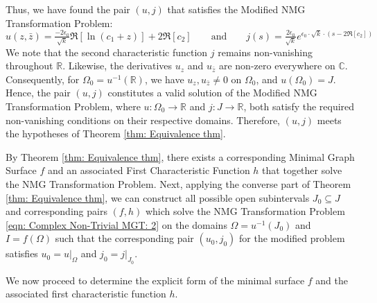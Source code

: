 \documentclass[12pt]{article}
\theoremstyle{plain}
\theoremstyle{definition}
\theoremstyle{remark}
\begin{document}
Thus, we have found the pair \((u,j)\) that satisfies the Modified NMG Transformation Problem:
\[
\boxed{u(z,\bar z)=\tfrac{-2\epsilon_0}{\sqrt{k}}\Re[\ln(c_1 +  z)]+2\Re[c_2]}\qquad\text{and}\qquad\boxed{j(s)=\tfrac{2\epsilon_0}{\sqrt{k}}e^{\epsilon_0\cdot\sqrt{k}\cdot(s-2\Re[c_2])}}
\]
We note that the second characteristic function \(j\) remains non-vanishing throughout \(\mathbb{R}\). Likewise, the derivatives \(u_z\) and \(u_{\bar{z}}\) are non-zero everywhere on \(\mathbb{C}\). Consequently, for \(\Omega_0 = u^{-1}(\mathbb{R})\), we have \(u_z, u_{\bar{z}} \neq 0\) on \(\Omega_0\), and \(u(\Omega_0) = J\). Hence, the pair \((u, j)\) constitutes a valid solution of the Modified NMG Transformation Problem, where \(u : \Omega_0 \to \mathbb{R}\) and \(j : J \to \mathbb{R}\), both satisfy the required non-vanishing conditions on their respective domains. Therefore, \((u, j)\) meets the hypotheses of Theorem \ref{thm: Equivalence thm}.

By Theorem \ref{thm: Equivalence thm}, there exists a corresponding Minimal Graph Surface \(f\) and an associated First Characteristic Function \(h\) that together solve the NMG Transformation Problem. Next, applying the converse part of Theorem \ref{thm: Equivalence thm}, we can construct all possible open subintervals \(J_0 \subseteq J\) and corresponding pairs \((f, h)\) which solve the NMG Transformation Problem \ref{eqn: Complex Non-Trivial MGT: 2} on the domains \(\Omega = u^{-1}(J_0)\) and \(I = f(\Omega)\) such that the corresponding pair \((u_0, j_0)\) for the modified problem satisfies \(u_0 = u|_{\Omega}\) and \(j_0 = j|_{J_0}.\)

We now proceed to determine the explicit form of the minimal surface \(f\) and the associated first characteristic function \(h\).
\end{document}
